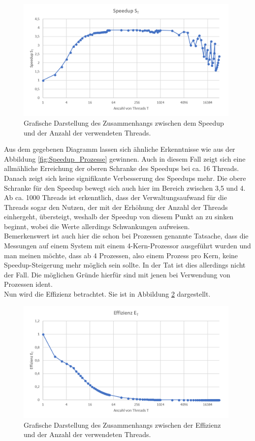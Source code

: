 \begin{description}
						\begin{figure}
							\centering	
							\includegraphics[width=11cm]{Abbildungen/Speedup_Threads.png}
							\caption{Grafische Darstellung des Zusammenhangs zwischen dem Speedup und der Anzahl der verwendeten Threads.}
							\label{fig:Speedup_Threads}
						\end{figure}
						
						Aus dem gegebenen Diagramm lassen sich ähnliche Erkenntnisse wie aus der Abbildung \ref{fig:Speedup_Prozesse} gewinnen. Auch in diesem Fall zeigt sich eine allmähliche Erreichung der oberen Schranke des Speedups bei ca. 16 Threads. Danach zeigt sich keine signifikante Verbesserung des Speedups mehr. Die obere Schranke für den Speedup bewegt sich auch hier im Bereich zwischen 3,5 und 4. Ab ca. 1000 Threads ist erkenntlich, dass der Verwaltungsaufwand für die Threads sogar den Nutzen, der mit der Erhöhung der Anzahl der Threads einhergeht, übersteigt, weshalb der Speedup von diesem Punkt an zu sinken beginnt, wobei die Werte allerdings Schwankungen aufweisen.\\
						Bemerkenswert ist auch hier die schon bei Prozessen genannte Tatsache, dass die Messungen auf einem System mit einem 4-Kern-Prozessor ausgeführt wurden und man meinen möchte, dass ab 4 Prozessen, also einem Prozess pro Kern, keine Speedup-Steigerung mehr möglich sein sollte. In der Tat ist dies allerdings nicht der Fall. Die möglichen Gründe hierfür sind mit jenen bei Verwendung von Prozessen ident.\\
						Nun wird die Effizienz betrachtet. Sie ist in Abbildung \ref{fig:Effizienz_Threads} dargestellt.
						
						\begin{figure}
							\centering	
							\includegraphics[width=11cm]{Abbildungen/Effizienz_Threads.png}
							\caption{Grafische Darstellung des Zusammenhangs zwischen der Effizienz und der Anzahl der verwendeten Threads.}
							\label{fig:Effizienz_Threads}
						\end{figure}
						

\end{description}
